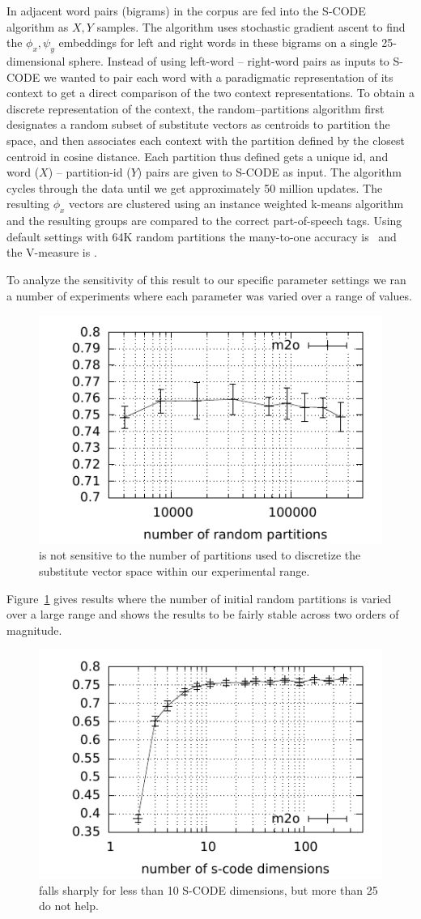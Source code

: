 In \cite{maron2010sphere} adjacent word pairs (bigrams) in the corpus
are fed into the S-CODE algorithm as $X, Y$ samples.  The algorithm
uses stochastic gradient ascent to find the $\phi_x, \psi_y$
embeddings for left and right words in these bigrams on a single
25-dimensional sphere.  Instead of using left-word -- right-word pairs
as inputs to S-CODE we wanted to pair each word with a paradigmatic
representation of its context to get a direct comparison of the two
context representations.  To obtain a discrete representation of the
context, the random--partitions algorithm first designates a random
subset of substitute vectors as centroids to partition the space, and
then associates each context with the partition defined by the closest
centroid in cosine distance.  Each partition thus defined gets a
unique id, and word ($X$) -- partition-id ($Y$) pairs are given to
S-CODE as input.  The algorithm cycles through the data until we get
approximately 50 million updates.  The resulting $\phi_x$ vectors are
clustered using an instance weighted k-means algorithm and the
resulting groups are compared to the correct part-of-speech tags.
Using default settings with 64K random partitions the many-to-one
accuracy is \rpmto\ and the V-measure is \rpvm.

To analyze the sensitivity of this result to our specific parameter
settings we ran a number of experiments where each parameter was
varied over a range of values.

\begin{figure}[ht] \centering
\includegraphics[width=0.5\linewidth]{plot-p.pdf}
\caption{\mto is not sensitive to the number of partitions used to
  discretize the substitute vector space within our experimental
  range.}
\label{plot-p}
\end{figure}

Figure~\ref{plot-p} gives results where the number of initial random
partitions is varied over a large range and shows the results to be
fairly stable across two orders of magnitude.

\begin{figure}[ht] \centering
\includegraphics[width=0.5\linewidth]{plot-d.pdf}
\caption{\mto falls sharply for less than 10 S-CODE dimensions, but
  more than 25 do not help.}
\label{plot-d}
\end{figure}

